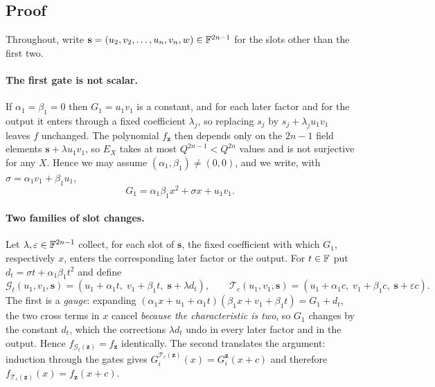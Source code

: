 \subsection{Proof}

Throughout, write $\mathbf s=(u_2,v_2,\dots,u_n,v_n,w)\in\mathbb{F}^{2n-1}$ for the slots other
than the first two.

\paragraph{The first gate is not scalar.}
If $\alpha_1=\beta_1=0$ then $G_1=u_1v_1$ is a constant, and for each later factor and for
the output it enters through a fixed coefficient $\lambda_j$, so replacing
$s_j$ by $s_j+\lambda_ju_1v_1$ leaves $f$ unchanged.  The polynomial $f_{\mathbf z}$ then
depends only on the $2n-1$ field elements $\mathbf s+\lambda u_1v_1$, so $E_X$ takes at most
$Q^{2n-1}<Q^{2n}$ values and is not surjective for any $X$.  Hence we may assume
$(\alpha_1,\beta_1)\neq(0,0)$, and we write, with $\sigma=\alpha_1v_1+\beta_1u_1$,
\begin{equation}
   G_1=\alpha_1\beta_1x^2+\sigma x+u_1v_1 .
   \label{eq:char2-firstgate}
\end{equation}

\paragraph{Two families of slot changes.}
Let $\lambda,\varepsilon\in\mathbb{F}^{2n-1}$ collect, for each slot of $\mathbf s$, the fixed
coefficient with which $G_1$, respectively $x$, enters the corresponding later factor or
the output.  For $t\in\mathbb{F}$ put $d_t=\sigma t+\alpha_1\beta_1t^2$ and define
\begin{equation}
   \mathcal G_t(u_1,v_1,\mathbf s)=(u_1+\alpha_1t,\;v_1+\beta_1t,\;\mathbf s+\lambda d_t),
   \qquad
   \mathcal T_c(u_1,v_1,\mathbf s)=(u_1+\alpha_1c,\;v_1+\beta_1c,\;\mathbf s+\varepsilon c).
   \label{eq:char2-gauge}
\end{equation}
The first is a \emph{gauge}: expanding
$(\alpha_1x+u_1+\alpha_1t)(\beta_1x+v_1+\beta_1t)=G_1+d_t$, the two cross terms in $x$
cancel \emph{because the characteristic is two}, so $G_1$ changes by the constant $d_t$,
which the corrections $\lambda d_t$ undo in every later factor and in the output.  Hence
$f_{\mathcal G_t(\mathbf z)}=f_{\mathbf z}$ identically.  The second translates the
argument: induction through the gates gives $G_i^{\mathcal T_c(\mathbf z)}(x)=G_i^{\mathbf
z}(x+c)$ and therefore $f_{\mathcal T_c(\mathbf z)}(x)=f_{\mathbf z}(x+c)$.

